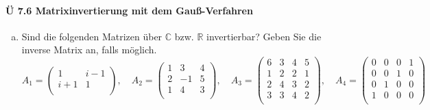 \documentclass{scrreprt}
\begin{document}
\paragraph{Ü 7.6 Matrixinvertierung mit dem Gauß-Verfahren}

\begin{enumerate}[(a)]
\item Sind die folgenden Matrizen über $\mathbb{C}$ bzw. $\mathbb{R}$
  invertierbar?
  Geben Sie die inverse Matrix an, falls möglich.
  \[
    A_1 = \begin{pmatrix}
      1     & i - 1 \\
      i + 1 & 1     \\
    \end{pmatrix}, \quad
    A_2 = \begin{pmatrix}
      1 & 3  & 4 \\
      2 & -1 & 5 \\
      1 & 4  & 3 \\
    \end{pmatrix}, \quad
    A_3 = \begin{pmatrix}
      6 & 3 & 4 & 5 \\
      1 & 2 & 2 & 1 \\
      2 & 4 & 3 & 2 \\
      3 & 3 & 4 & 2 \\
    \end{pmatrix}, \quad
    A_4 = \begin{pmatrix}
      0 & 0 & 0 & 1 \\
      0 & 0 & 1 & 0 \\
      0 & 1 & 0 & 0 \\
      1 & 0 & 0 & 0 \\
    \end{pmatrix}
  \]


\end{enumerate}
\end{document}
